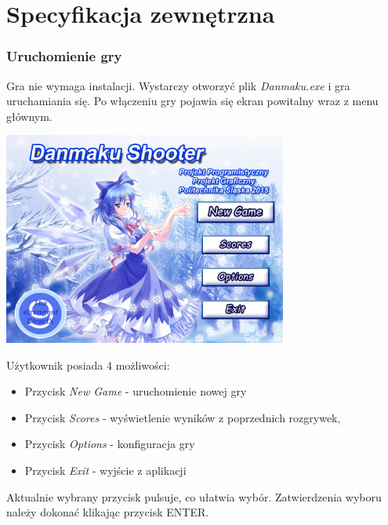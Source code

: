 \newpage
\part{\huge \textbf{Specyfikacja zewnętrzna}}
	\section{Uruchomienie gry}
		Gra nie wymaga instalacji. Wystarczy otworzyć plik \textit{Danmaku.exe} i gra uruchamiania się. Po włączeniu gry pojawia się ekran powitalny wraz z menu głównym.
		\begin{center}
			\includegraphics[width=0.7\textwidth]{./images/titlescreen_clear}
		\end{center}
		Użytkownik posiada 4 możliwości:
		\begin{itemize}
			\item Przycisk \emph{New Game} \tab - uruchomienie nowej gry
			\item Przycisk \emph{Scores} \tab - wyświetlenie wyników z poprzednich rozgrywek,
			\item Przycisk \emph{Options} \tab - konfiguracja gry
			\item Przycisk \emph{Exit} \tab - wyjście z aplikacji
		\end{itemize}
		Aktualnie wybrany przycisk pulsuje, co ułatwia wybór. Zatwierdzenia wyboru należy dokonać klikając przycisk ENTER.
	\newpage
